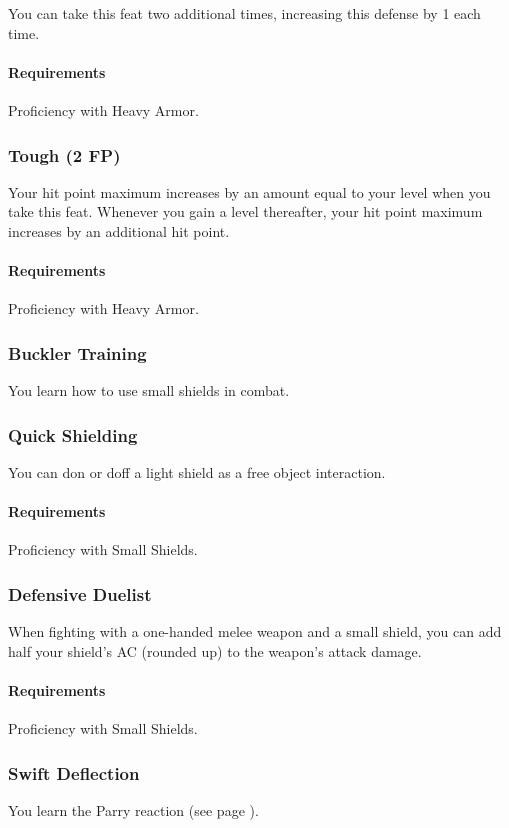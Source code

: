     You can take this feat two additional times, increasing this defense by 1 each time.
    \paragraph{Requirements} Proficiency with Heavy Armor.
\subsubsection{Tough (2 FP)} \label{feat::tough}
    Your hit point maximum increases by an amount equal to your level when you take this feat.
    Whenever you gain a level thereafter, your hit point maximum increases by an additional hit point.
    \paragraph{Requirements} Proficiency with Heavy Armor.

\subsubsection{Buckler Training} \label{feat::bucklertraining}
    You learn how to use small shields in combat.
\subsubsection{Quick Shielding} \label{feat::quickshielding}
    You can don or doff a light shield as a free object interaction.
    \paragraph{Requirements} Proficiency with Small Shields.
\subsubsection{Defensive Duelist} \label{feat::defensiveduelist}
    When fighting with a one-handed melee weapon and a small shield, you can add half your shield's AC (rounded up) to the weapon's attack damage.
    \paragraph{Requirements} Proficiency with Small Shields.
\subsubsection{Swift Deflection} \label{feat::swiftdeflection}
    You learn the Parry reaction (see page \pageref{act::parry}).


